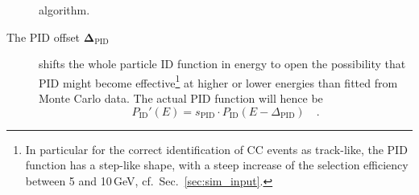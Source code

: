 \begin{description}
  algorithm.
 \item[The PID offset $\mathbf{\Delta_\mathrm{PID}}$] shifts the whole particle
  ID function in energy to open the possibility that PID might become
  effective\footnote{In particular for the correct identification of \numu CC
  events as track-like, the PID function has a step-like shape, with a steep
  increase of the selection efficiency between 5 and 10\,GeV, cf.\
  Sec.~\ref{sec:sim_input}.} at higher or lower energies than fitted from
  Monte Carlo data. The actual PID function will hence be
  \begin{equation}
    P_\mathrm{ID}'(E) = s_\mathrm{PID}\cdot P_\mathrm{ID}(E-\Delta_\mathrm{PID})
      \quad.
  \end{equation}
\end{description}

